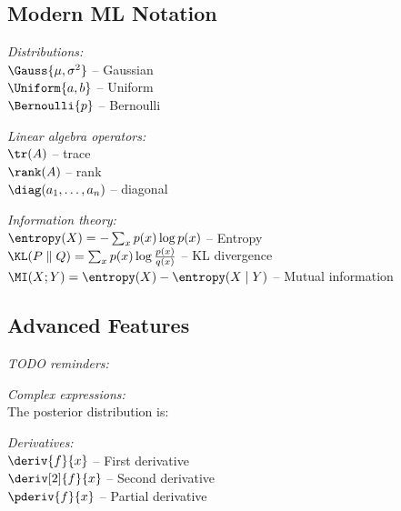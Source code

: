 \subsection{Modern ML Notation}

\emph{Distributions:}\\
$\Gauss{\mu, \sigma^2}$ -- Gaussian\\
$\Uniform{a, b}$ -- Uniform\\
$\Bernoulli{p}$ -- Bernoulli

\emph{Linear algebra operators:}\\
$\tr(A)$ -- trace\\
$\rank(A)$ -- rank\\
$\diag(a_1, \ldots, a_n)$ -- diagonal

\emph{Information theory:}\\
$\entropy(X) = -\sum_x p(x) \log p(x)$ -- Entropy\\
$\KL(P \parallel Q) = \sum_x p(x) \log \frac{p(x)}{q(x)}$ -- KL divergence\\
$\MI(X; Y) = \entropy(X) - \entropy(X \mid Y)$ -- Mutual information

\subsection{Advanced Features}

\emph{TODO reminders:}\\

\emph{Complex expressions:}\\
The posterior distribution is:

\emph{Derivatives:}\\
$\deriv{f}{x}$ -- First derivative\\
$\deriv[2]{f}{x}$ -- Second derivative\\
$\pderiv{f}{x}$ -- Partial derivative